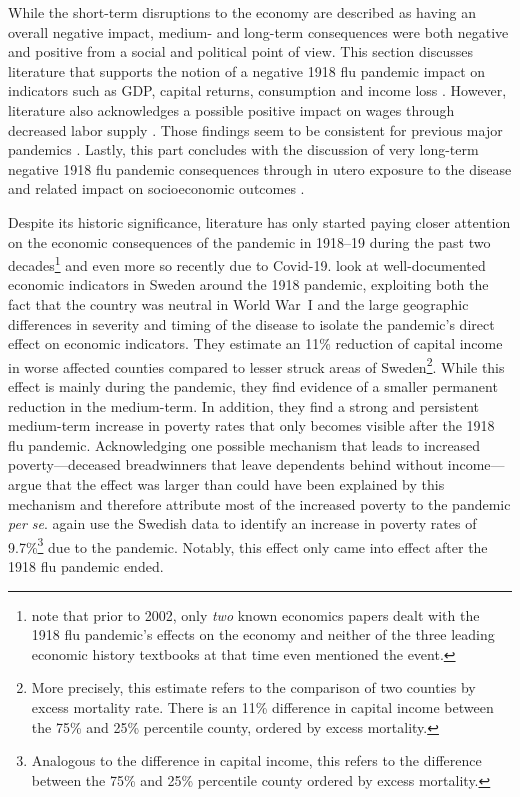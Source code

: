 \documentclass[12pt,a4paper]{article}
\begin{document}
While the short-term disruptions to the economy are described as having an overall negative impact, medium- and long-term consequences were both negative and positive from a social and political point of view.
This section discusses literature that supports the notion of a negative 1918 flu pandemic impact on indicators such as GDP, capital returns, consumption \citep{karlssonImpact1918Spanish2014, barroCoronavirusGreatInfluenza2020, correiaPandemicsDepressEconomy2020} and income loss \citep{fanInclusiveCostPandemic2016}.
However, literature also acknowledges a possible positive impact on wages through decreased labor supply \citep{brainerdEconomicEffects19182003}.
Those findings seem to be consistent for previous major pandemics \citep{jordaLongerrunEconomicConsequences2020}.
Lastly, this part concludes with the discussion of very long-term negative 1918 flu pandemic consequences through in utero exposure to the disease and related impact on socioeconomic outcomes \citep{almond1918InfluenzaPandemic2006}.

Despite its historic significance, literature has only started paying closer attention on the economic consequences of the pandemic in 1918--19 during the past two decades\footnote{\cite{brainerdEconomicEffects19182003} note that prior to 2002, only \textit{two} known economics papers dealt with the 1918 flu pandemic's effects on the economy and neither of the three leading economic history textbooks at that time even mentioned the event.} and even more so recently due to Covid-19.
\cite{karlssonImpact1918Spanish2014} look at well-documented economic indicators in Sweden around the 1918 pandemic, exploiting both the fact that the country was neutral in World War~I and the large geographic differences in severity and timing of the disease to isolate the pandemic's direct effect on economic indicators.
They estimate an 11\% reduction of capital income in worse affected counties compared to lesser struck areas of Sweden\footnote{More precisely, this estimate refers to the comparison of two counties by excess mortality rate. There is an 11\% difference in capital income between the 75\% and 25\% percentile county, ordered by excess mortality.}.
While this effect is mainly during the pandemic, they find evidence of a smaller permanent reduction in the medium-term.
In addition, they find a strong and persistent medium-term increase in poverty rates that only becomes visible after the 1918 flu pandemic.
Acknowledging one possible mechanism that leads to increased poverty---deceased breadwinners that leave dependents behind without income---\cite{karlssonImpact1918Spanish2014} argue that the effect was larger than could have been explained by this mechanism and therefore attribute most of the increased poverty to the pandemic \textit{per se}.
\cite{karlssonImpact1918Spanish2014} again use the Swedish data to identify an increase in poverty rates of 9.7\%\footnote{Analogous to the difference in capital income, this refers to the difference between the 75\% and 25\% percentile county ordered by excess mortality.} due to the pandemic.
Notably, this effect only came into effect after the 1918 flu pandemic ended.
\end{document}
